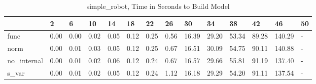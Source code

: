 \begin{table}
\caption{simple_robot, Time in Seconds to Build Model}
\label{simple_robot_model_time}
\begin{tabular}{llllllllllllll}
\toprule
 & 2 & 6 & 10 & 14 & 18 & 22 & 26 & 30 & 34 & 38 & 42 & 46 & 50 \\
\midrule
func & 0.00 & 0.00 & 0.02 & 0.05 & 0.12 & 0.25 & 0.56 & 16.39 & 29.20 & 53.34 & 89.28 & 140.29 & - \\
norm & 0.00 & 0.01 & 0.03 & 0.05 & 0.12 & 0.25 & 0.67 & 16.51 & 30.09 & 54.75 & 90.11 & 140.88 & - \\
no_internal & 0.00 & 0.01 & 0.02 & 0.06 & 0.12 & 0.24 & 0.67 & 16.57 & 29.66 & 55.81 & 91.19 & 137.40 & - \\
s_var & 0.00 & 0.01 & 0.02 & 0.05 & 0.12 & 0.24 & 1.12 & 16.18 & 29.29 & 54.20 & 91.11 & 137.54 & - \\
\bottomrule
\end{tabular}
\end{table}
